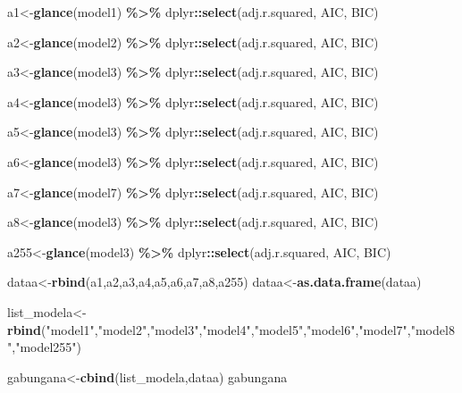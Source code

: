 \documentclass[
]{article}
\newenvironment{Shaded}{\begin{snugshade}}{\end{snugshade}}
\newcommand{\FunctionTok}[1]{\textcolor[rgb]{0.13,0.29,0.53}{\textbf{#1}}}
\newcommand{\NormalTok}[1]{#1}
\newcommand{\OtherTok}[1]{\textcolor[rgb]{0.56,0.35,0.01}{#1}}
\newcommand{\SpecialCharTok}[1]{\textcolor[rgb]{0.81,0.36,0.00}{\textbf{#1}}}
\newcommand{\StringTok}[1]{\textcolor[rgb]{0.31,0.60,0.02}{#1}}
\begin{document}
\begin{Shaded}
\begin{Highlighting}[]
\NormalTok{a1}\OtherTok{\textless{}{-}}\FunctionTok{glance}\NormalTok{(model1) }\SpecialCharTok{\%\textgreater{}\%}\NormalTok{ dplyr}\SpecialCharTok{::}\FunctionTok{select}\NormalTok{(adj.r.squared,  AIC, BIC)}

\NormalTok{a2}\OtherTok{\textless{}{-}}\FunctionTok{glance}\NormalTok{(model2) }\SpecialCharTok{\%\textgreater{}\%}\NormalTok{ dplyr}\SpecialCharTok{::}\FunctionTok{select}\NormalTok{(adj.r.squared, AIC, BIC)}

\NormalTok{a3}\OtherTok{\textless{}{-}}\FunctionTok{glance}\NormalTok{(model3) }\SpecialCharTok{\%\textgreater{}\%}\NormalTok{ dplyr}\SpecialCharTok{::}\FunctionTok{select}\NormalTok{(adj.r.squared, AIC, BIC)}

\NormalTok{a4}\OtherTok{\textless{}{-}}\FunctionTok{glance}\NormalTok{(model3) }\SpecialCharTok{\%\textgreater{}\%}\NormalTok{ dplyr}\SpecialCharTok{::}\FunctionTok{select}\NormalTok{(adj.r.squared, AIC, BIC)}

\NormalTok{a5}\OtherTok{\textless{}{-}}\FunctionTok{glance}\NormalTok{(model3) }\SpecialCharTok{\%\textgreater{}\%}\NormalTok{ dplyr}\SpecialCharTok{::}\FunctionTok{select}\NormalTok{(adj.r.squared, AIC, BIC)}

\NormalTok{a6}\OtherTok{\textless{}{-}}\FunctionTok{glance}\NormalTok{(model3) }\SpecialCharTok{\%\textgreater{}\%}\NormalTok{ dplyr}\SpecialCharTok{::}\FunctionTok{select}\NormalTok{(adj.r.squared, AIC, BIC)}

\NormalTok{a7}\OtherTok{\textless{}{-}}\FunctionTok{glance}\NormalTok{(model7) }\SpecialCharTok{\%\textgreater{}\%}\NormalTok{ dplyr}\SpecialCharTok{::}\FunctionTok{select}\NormalTok{(adj.r.squared, AIC, BIC)}

\NormalTok{a8}\OtherTok{\textless{}{-}}\FunctionTok{glance}\NormalTok{(model3) }\SpecialCharTok{\%\textgreater{}\%}\NormalTok{ dplyr}\SpecialCharTok{::}\FunctionTok{select}\NormalTok{(adj.r.squared, AIC, BIC)}

\NormalTok{a255}\OtherTok{\textless{}{-}}\FunctionTok{glance}\NormalTok{(model3) }\SpecialCharTok{\%\textgreater{}\%}\NormalTok{ dplyr}\SpecialCharTok{::}\FunctionTok{select}\NormalTok{(adj.r.squared, AIC, BIC)}

\NormalTok{dataa}\OtherTok{\textless{}{-}}\FunctionTok{rbind}\NormalTok{(a1,a2,a3,a4,a5,a6,a7,a8,a255)}
\NormalTok{dataa}\OtherTok{\textless{}{-}}\FunctionTok{as.data.frame}\NormalTok{(dataa)}

\NormalTok{list\_modela}\OtherTok{\textless{}{-}}\FunctionTok{rbind}\NormalTok{(}\StringTok{"model1"}\NormalTok{,}\StringTok{"model2"}\NormalTok{,}\StringTok{"model3"}\NormalTok{,}\StringTok{"model4"}\NormalTok{,}\StringTok{"model5"}\NormalTok{,}\StringTok{"model6"}\NormalTok{,}\StringTok{"model7"}\NormalTok{,}\StringTok{"model8"}\NormalTok{,}\StringTok{"model255"}\NormalTok{)}

\NormalTok{gabungana}\OtherTok{\textless{}{-}}\FunctionTok{cbind}\NormalTok{(list\_modela,dataa)}
\NormalTok{gabungana}
\end{Highlighting}
\end{Shaded}
\end{document}
